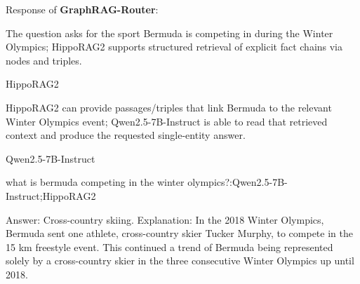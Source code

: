 \clearpage
\twocolumn
\flushbottom







\clearpage

\begin{center}
\begin{minipage}{0.96\textwidth}

\begin{tcolorbox}[
  casestudybox,
  width=\linewidth,
  title={\textbf{Question:} What is bermuda competing in the winter olympics?\\[2mm]
  \textbf{Ground Truth:} Cross-country skiing}
]
Response of \textbf{GraphRAG-Router}: \par\medskip

The question asks for the sport Bermuda is competing in during the Winter Olympics; HippoRAG2 supports structured retrieval of explicit fact chains via nodes and triples. \par

HippoRAG2\par

HippoRAG2 can provide passages/triples that link Bermuda to the relevant Winter Olympics event; Qwen2.5-7B-Instruct is able to read that retrieved context and produce the requested single-entity answer. \par

Qwen2.5-7B-Instruct \par

{\raggedright
{}what is bermuda competing in the winter olympics?\allowbreak:\allowbreak Qwen2.5-7B-Instruct\allowbreak;\allowbreak HippoRAG2\par
}

Answer: Cross-country skiing. Explanation: In the 2018 Winter Olympics, Bermuda sent one athlete, cross-country skier Tucker Murphy, to compete in the 15 km freestyle event. This continued a trend of Bermuda being represented solely by a cross-country skier in the three consecutive Winter Olympics up until 2018. \par


\end{tcolorbox}
\end{minipage}
\end{center}

